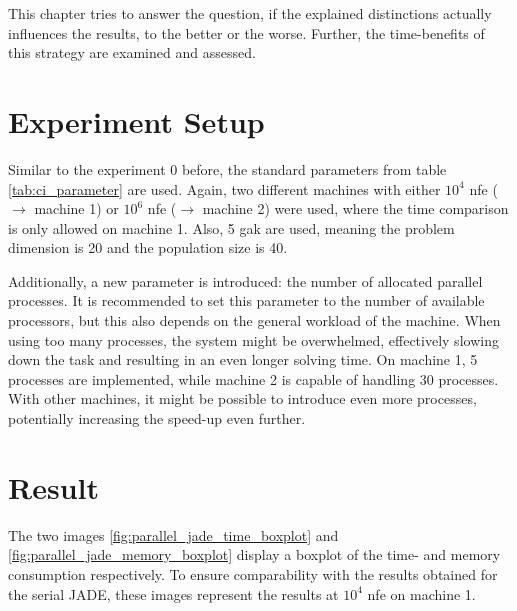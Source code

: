\documentclass[./\jobname.tex]{subfiles}
\begin{document}
This chapter tries to answer the question, if the explained distinctions actually influences the results, to the better or the worse. Further, the time-benefits of this strategy are examined and assessed.

\section{Experiment Setup}
Similar to the experiment 0 before, the standard parameters from table \ref{tab:ci_parameter} are used. Again, two different machines with either $10^4$ \gls{nfe} ($\rightarrow$ machine 1) or $10^6$ \gls{nfe} ($\rightarrow$ machine 2) were used, where the time comparison is only allowed on machine 1. Also, 5 \gls{gak} are used, meaning the problem dimension is 20 and the population size is 40. 

Additionally, a new parameter is introduced: the number of allocated parallel processes. It is recommended to set this parameter to the number of available processors, but this also depends on the general workload of the machine. When using too many processes, the system might be overwhelmed, effectively slowing down the task and resulting in an even longer solving time. On machine 1, 5 processes are implemented, while machine 2 is capable of handling 30 processes. With other machines, it might be possible to introduce even more processes, potentially increasing the speed-up even further. 

\section{Result}

The two images \ref{fig:parallel_jade_time_boxplot} and \ref{fig:parallel_jade_memory_boxplot} display a boxplot of the time- and memory consumption respectively. To ensure comparability with the results obtained for the serial JADE, these images represent the results at $10^4$ \gls{nfe} on machine 1. 
\end{document}
